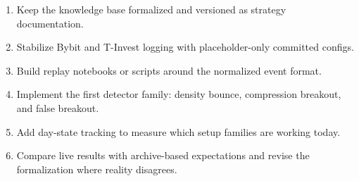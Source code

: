\begin{enumerate}[leftmargin=1.5em]
\item Keep the knowledge base formalized and versioned as strategy documentation.
\item Stabilize Bybit and T-Invest logging with placeholder-only committed configs.
\item Build replay notebooks or scripts around the normalized event format.
\item Implement the first detector family: density bounce, compression breakout, and false breakout.
\item Add day-state tracking to measure which setup families are working today.
\item Compare live results with archive-based expectations and revise the formalization where reality disagrees.
\end{enumerate}
